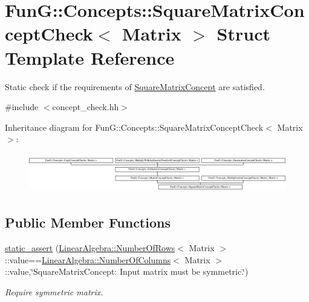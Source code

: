 \hypertarget{structFunG_1_1Concepts_1_1SquareMatrixConceptCheck}{\section{\-Fun\-G\-:\-:\-Concepts\-:\-:\-Square\-Matrix\-Concept\-Check$<$ \-Matrix $>$ \-Struct \-Template \-Reference}
\label{structFunG_1_1Concepts_1_1SquareMatrixConceptCheck}
}


\-Static check if the requirements of \hyperlink{structFunG_1_1Concepts_1_1SquareMatrixConcept}{\-Square\-Matrix\-Concept} are satisfied.  




{\ttfamily \#include $<$concept\-\_\-check.\-hh$>$}

\-Inheritance diagram for \-Fun\-G\-:\-:\-Concepts\-:\-:\-Square\-Matrix\-Concept\-Check$<$ \-Matrix $>$\-:\begin{figure}[H]
\begin{center}
\leavevmode
\includegraphics[height=1.728395cm]{structFunG_1_1Concepts_1_1SquareMatrixConceptCheck}
\end{center}
\end{figure}
\subsection*{\-Public \-Member \-Functions}
\begin{DoxyCompactItemize}
\item 
\hyperlink{structFunG_1_1Concepts_1_1SquareMatrixConceptCheck_a93aa24650caca6ff2fa631c299088770}{static\-\_\-assert} (\hyperlink{structFunG_1_1LinearAlgebra_1_1NumberOfRows}{\-Linear\-Algebra\-::\-Number\-Of\-Rows}$<$ \-Matrix $>$\-::value==\hyperlink{structFunG_1_1LinearAlgebra_1_1NumberOfColumns}{\-Linear\-Algebra\-::\-Number\-Of\-Columns}$<$ \-Matrix $>$\-::value,\char`\"{}\-Square\-Matrix\-Concept\-: \-Input matrix must be symmetric.\char`\"{})
\begin{DoxyCompactList}\small\item\em \-Require symmetric matrix. \end{DoxyCompactList}\end{DoxyCompactItemize}


